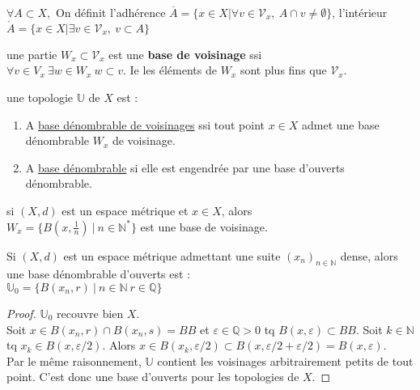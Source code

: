 \begin{definition}
$\forall A\subset X,$ On définit l'adhérence $\overline{A}=\{x\in X|\forall v\in \mathcal{V}_x,\ A\cap v\neq \emptyset  \}$, l'intérieur $\mathring{A}=\{x\in X|\exists v\in \mathcal{V}_x,\ v\subset A\}$
\end{definition}
\begin{definition}
    une partie $W_x\subset \mathcal{V}_x$ est une \textbf{base de voisinage} ssi \\$\forall v\in V_x\ \exists w\in W_x\ w\subset v$. Ie les éléments de $W_x$ sont plus fins que $\mathcal{V}_x$.
\end{definition}
\begin{definition}
     une topologie $\mathbb{U}$ de $X$ est :
\begin{enumerate}
    \item A \underline{base dénombrable de voisinages} ssi tout point $x\in X$ admet une base dénombrable $W_x$ de voisinage.
    \item A \underline{base dénombrable} si elle est engendrée par une base d'ouverts dénombrable.
\end{enumerate}
\end{definition}
\begin{remarque}
    si $(X,d)$ est un espace métrique et $x\in X$, alors \\
    $W_x=\{B(x,\frac{1}{n})\ |\ n\in \mathbb{N} ^*\}$ est une base de voisinage.
\end{remarque}
\begin{remarque}
    Si $(X,d)$ est un espace métrique admettant une suite $(x_n)_{n\in \mathbb{N} }$ dense, alors une base dénombrable d'ouverts est :\\
    $\mathbb{U}_0=\{B(x_{n}, r)\ |\ n\in \mathbb{N} \ r\in \mathbb{Q} \}$
\end{remarque}
\begin{proof}
    $\mathbb{U}_0$ recouvre bien $X$. \\
    Soit $x\in B(x_{n}, r)\cap B(x_{n}, s)=BB$ et $\varepsilon\in \mathbb{Q} >0 $ tq $B(x,\varepsilon )\subset BB$. Soit $k\in \mathbb{N} $ tq $x_k\in B(x,\varepsilon /2)$. Alors $x\in B(x_k, \varepsilon /2)\subset B(x,\varepsilon /2 + \varepsilon /2)=B(x,\varepsilon)$. \\

\noindent Par le même raisonnement, $\mathbb{U}$ contient les voisinages arbitrairement petits de tout point. C'est donc une base d'ouverts pour les topologies de $X$.
\end{proof}
